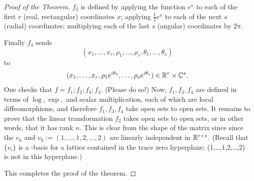 \documentclass[10pt,a4paper,reqno]{amsart}
\begin{document}
\begin{proof}[Proof of the Theorem]
$f_3$ is defined by applying the function $e^x$ to each of the first $r$ (real,
rectangular) coordinates $x$; applying $\frac{1}{2}e^x$ to each of the next $s$
(radial) coordinates; multiplying each of the last $s$ (angular) coordinates by
$2\pi.$

Finally $f_4$ sends \[(x_1,\dots,x_r,\rho_1,\dots,\rho_s,
\theta_1,\dots,\theta_s)\] to \[ (x_1,\dots,x_r,\rho_1 e^{i\theta_1},\dots,
\rho_s e^{i\theta_s}) \in \mathbb{R}^r\times \mathbb{C}^s. \] One checks that $f = f_1 ; f_2 ;
f_3 ; f_4$. (Please do so!) Now, $f_1,f_3,f_4$ are defined in terms of
$\log,\exp,$ and scalar multiplication, each of which are local
diffeomorphisms, and therefore $f_1,f_3,f_4$ take open sets to open sets. It
remains to prove that the linear transformation $f_2$ takes open sets to open
sets, or in other words, that it has rank $n$. This is clear from the shape of
the matrix since since the $v_k$ and $v_0 := (1,\dots,1,2,\dots,2)$ are
linearly independent in $\mathbb{R}^{r+s}.$ (Recall that $\{v_i\}$ is a \Z-basis for a
lattice contained in the trace zero hyperplane; (1,\dots,1,2,\dots,2) is not in
this hyperplane.)

This completes the proof of the theorem.
\end{proof}
\end{document}
